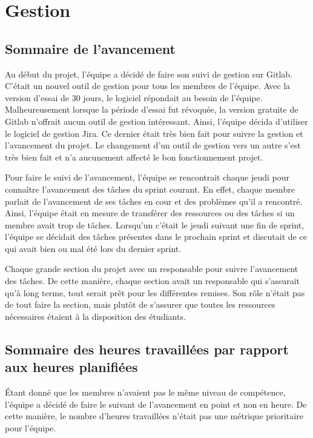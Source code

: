 \section{Gestion}
    \subsection{Sommaire de l'avancement}
    Au début du projet, l'équipe a décidé de faire son suivi de gestion sur Gitlab. C'était un nouvel outil de gestion pour tous les membres de l'équipe. Avec la version d'essai de 30 jours, le logiciel répondait au besoin de l'équipe. Malheureusement lorsque la période d'essai fut révoquée, la version gratuite de Gitlab n'offrait aucun outil de gestion intéressant. Ainsi, l'équipe décida d'utiliser le logiciel de gestion Jira. Ce dernier était très bien fait pour suivre la gestion et l'avancement du projet. Le changement d'un outil de gestion vers un autre s'est très bien fait et n'a aucunement affecté le bon fonctionnement projet.

    Pour faire le suivi de l'avancement, l'équipe se rencontrait chaque jeudi pour connaître l'avancement des tâches du sprint courant. En effet, chaque membre parlait de l'avancement de ses tâches en cour et des problèmes qu'il a rencontré. Ainsi, l'équipe était en mesure de transférer des ressources ou des tâches si un membre avait trop de tâches. Lorsqu'un c'était le jeudi suivant une fin de sprint, l'équipe se décidait des tâches présentes dans le prochain sprint et discutait de ce qui avait bien ou mal été lors du dernier sprint.
    
    Chaque grande section du projet avec un responsable pour suivre l'avancement des tâches. De cette manière, chaque section avait un responsable qui s'assurait qu'à long terme, tout serait prêt pour les différentes remises. Son rôle n'était pas de tout faire la section, mais plutôt de s'assurer que toutes les ressources nécessaires étaient à la disposition des étudiants.

    \subsection{Sommaire des heures travaillées par rapport aux heures planifiées}
    Étant donné que les membres n'avaient pas le même niveau de compétence, l'équipe a décidé de faire le suivant de l'avancement en point et non en heure. De cette manière, le nombre d'heures travaillées n'était pas une métrique prioritaire pour l'équipe.

